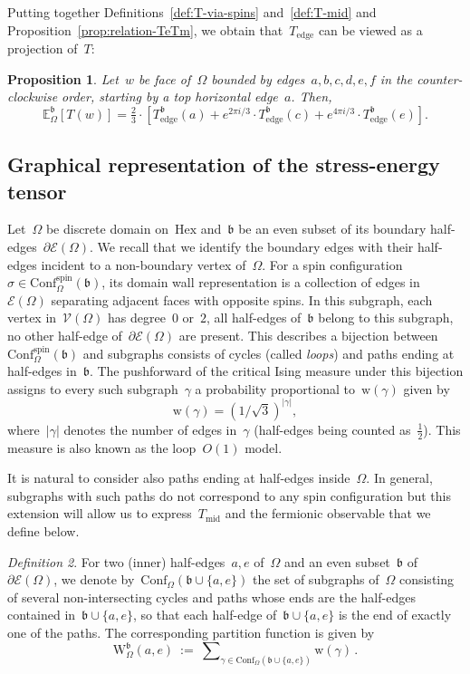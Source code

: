 \documentclass[reqno,11pt,a4paper]{amsart}
\newtheorem{proposition}{Proposition}[section]
\theoremstyle{remark}
\newtheorem{definition}[proposition]{Definition}
\newcommand{\bbE}{\mathbb{E}}
\newcommand{\Vertices}{\mathcal{V}}
\newcommand{\Edges}{\mathcal{E}}
\newcommand{\Hex}{\mathrm{Hex}}
\newcommand{\Te}{T_{\mathrm{edge}}}       \newcommand{\Ce}{c_{\mathrm{edge}}}
\newcommand{\Tm}{T_{\mathrm{mid}}}        \newcommand{\Cm}{c_{\mathrm{mid}}}
\renewcommand{\b}{\mathfrak{b}}
\newcommand{\weight}{\mathrm{w}}
\newcommand{\conf}{\mathrm{Conf}}
\newcommand\ConfO[1]{\conf_\Omega(#1)}
\newcommand\ConfOs[1]{\conf^{\mathrm{spin}}_\Omega(#1)}
\def\Weight{\mathrm{W}}
\begin{document}
Putting together Definitions~\ref{def:T-via-spins} and~\ref{def:T-mid} and Proposition~\ref{prop:relation-TeTm}, we obtain that~$\Te$ can be viewed as a projection of~$T$:

\begin{proposition}\label{prop:T-via-edges}
	Let~$w$ be face of~$\Omega$ bounded by edges~$a,b,c,d,e,f$ in the counter-clockwise order, starting by a top horizontal edge~$a$.
	Then,
	\[
		\bbE_{\Omega}^{\b}[T(w)] = \tfrac23 \cdot \left[\Te^{\b}(a) + e^{2\pi i/3}  \cdot \Te^{\b}(c) + e^{4\pi i/3}\cdot  \Te^{\b}(e)\right]. 
	\]
\end{proposition}

\subsection{Graphical representation of the stress-energy tensor}
\label{sub:graphical}

Let~$\Omega$ be discrete domain on~$\Hex$ and~$\b$ be an even subset of its boundary half-edges~$\partial\Edges(\Omega)$.
We recall that we identify the boundary edges with their half-edges incident to a non-boundary vertex of~$\Omega$.
For a spin configuration~$\sigma\in \ConfOs{\b}$, its domain wall representation is a collection of edges in~$\Edges(\Omega)$ separating adjacent faces with opposite spins.
In this subgraph, each vertex in~$\Vertices(\Omega)$ has degree~$0$ or~$2$, all half-edges of~$\b$ belong to this subgraph, no other half-edge of~$\partial\Edges(\Omega)$ are present.
This describes a bijection between~$\ConfOs{\b}$ and subgraphs consists of cycles (called {\em loops}) and paths ending at half-edges in~$\b$.
The pushforward of the critical Ising measure under this bijection assigns to every such subgraph~$\gamma$ a probability proportional to~$\weight(\gamma)$ given by
\[
	\weight(\gamma)= (1/\sqrt{3})^{|\gamma|},
\]
where~$|\gamma|$ denotes the number of edges in~$\gamma$ (half-edges being counted as~$\tfrac{1}{2}$).
This measure is also known as the loop~$O(1)$ model.

It is natural to consider also paths ending at half-edges inside~$\Omega$.
In general, subgraphs with such paths do not correspond to any spin configuration but this extension will allow us to express~$\Tm$ and the fermionic observable that we define below.

\begin{definition}\label{def:loop-conf-on-tiling}
	For two (inner) half-edges~$a,e$ of~$\Omega$ and an even subset~$\b$ of~$\partial\Edges(\Omega)$, we denote by~$\ConfO{\b\cup\{a,e\}}$ the set
	of subgraphs of~$\Omega$ consisting of several non-intersecting cycles and paths whose ends are the half-edges
	contained in~$\b\cup\{a,e\}$, so that each half-edge of~$\b\cup\{a,e\}$ is the end of exactly one of the paths.
	The corresponding partition function is given by
	\[
		\Weight^\b_\Omega(a,e)~:=~ \sum\nolimits_{\gamma\in\ConfO{\b\cup\{a,e\}}}\weight(\gamma)\,.
	\]
\end{definition}
\end{document}
